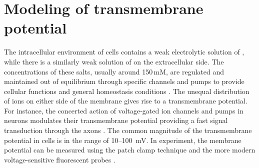 \documentclass[12pt,a4paper,twoside,openright]{report}
\begin{document}

\section*{Modeling of transmembrane potential}

The intracellular environment of cells contains a weak electrolytic solution of , 
while there is a similarly weak solution of  on the extracellular side. 
The concentrations of these salts, usually around 150\,mM, 
are regulated and maintained out of equilibrium through specific channels and pumps 
to provide cellular functions and general homeostasis conditions \citep{Bezanilla2008, Knudsen_book2002}. 
The unequal distribution of ions on either side of the membrane
gives rise to a transmembrane potential. 
For instance, the concerted action of voltage-gated ion channels and pumps in neurons 
modulates their transmembrane potential
providing a fast signal transduction through the axons \citep{Knudsen_book2002, Storace2015, Sung2015}. 
The common magnitude of the transmembrane potential in cells is in the range of 10--100~mV. 
In experiment, the membrane potential can be measured using the patch clamp technique \citep{Bezanilla2008}
and the more modern voltage-sensitive fluorescent probes \citep{Storace2015, Sung2015}. 
\end{document}
